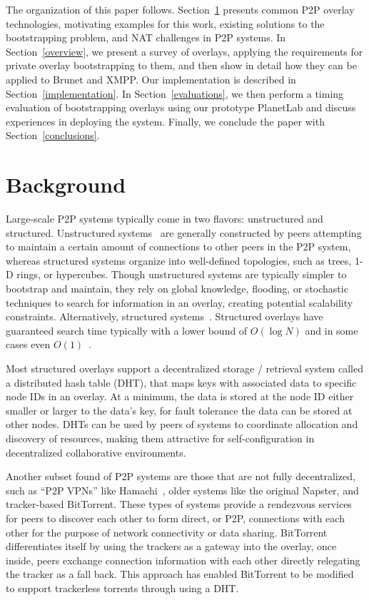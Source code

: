\documentclass[conference]{IEEEtran}
\begin{document}
The organization of this paper follows.  Section~\ref{background} presents
common P2P overlay technologies, motivating examples for this work, existing
solutions to the bootstrapping problem, and NAT challenges in P2P systems.  In
Section~\ref{overview}, we present a survey of overlays, applying the
requirements for private overlay bootstrapping to them, and then show in detail
how they can be applied to Brunet and XMPP.  Our implementation is described in
Section~\ref{implementation}.  In Section~\ref{evaluations}, we then perform a
timing evaluation of bootstrapping overlays using our prototype PlanetLab and
discuss experiences in deploying the system.  Finally, we conclude the paper
with Section~\ref{conclusions}.

\section{Background}
\label{background}

Large-scale P2P systems typically come in two flavors:  unstructured and
structured.  Unstructured systems~\cite{gnutella, fasttrack} are generally
constructed by peers attempting to maintain a certain amount of connections to
other peers in the P2P system, whereas structured systems organize into
well-defined topologies, such as trees, 1-D rings, or hypercubes.  Though
unstructured systems are typically simpler to bootstrap and maintain, they rely
on global knowledge, flooding, or stochastic techniques to search for
information in an overlay, creating potential scalability constraints.
Alternatively, structured systems~\cite{pastry, chord, symphony, kademlia,
can}.  Structured overlays have guaranteed search time typically with a lower
bound of $O(\log N)$ and in some cases even $O(1)$~\cite{beehive}.

Most structured overlays support a decentralized storage / retrieval system
called a distributed hash table (DHT), that maps keys with associated data to
specific node IDs in an overlay.  At a minimum, the data is stored at the node
ID either smaller or larger to the data's key, for fault tolerance the data can
be stored at other nodes.  DHTs can be used by peers of systems to coordinate
allocation and discovery of resources, making them attractive for
self-configuration in decentralized collaborative environments.

Another subset found of P2P systems are those that are not fully decentralized,
such as ``P2P VPNs'' like Hamachi~\cite{hamachi}, older systems like the
original Napster, and tracker-based BitTorrent.  These types of systems provide
a rendezvous services for peers to discover each other to form direct, or P2P,
connections with each other for the purpose of network connectivity or data
sharing.  BitTorrent differentiates itself by using the trackers as a gateway
into the overlay, once inside, peers exchange connection information with each
other directly relegating the tracker as a fall back.  This approach has
enabled BitTorrent to be modified to support trackerless torrents through using
a DHT.
\end{document}
